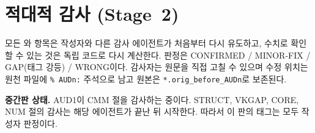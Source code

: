 \section{적대적 감사 (Stage~2)}\label{LEAD:audit}
모든 \PROVED{}와 \REFUTED{} 항목은 작성자와 다른 감사 에이전트가 처음부터 다시 유도하고, 수치로 확인할 수 있는 것은 독립 코드로 다시 계산한다. 판정은 CONFIRMED / MINOR-FIX / GAP(태그 강등) / WRONG이다. 감사자는 원문을 직접 고칠 수 있으며 수정 위치는 원천 파일에 \texttt{\% AUDn:} 주석으로 남고 원본은 \texttt{*.orig\_before\_AUDn}로 보존된다.

\medskip\noindent\textbf{중간판 상태.} AUD1이 CMM 절을 감사하는 중이다. STRUCT, VKGAP, CORE, NUM 절의 감사는 해당 에이전트가 끝난 뒤 시작한다. 따라서 이 판의 \PROVED{} 태그는 모두 작성자 판정이다.
